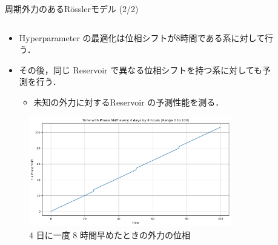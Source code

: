 \begin{frame}{周期外力のあるRösslerモデル (2/2)}
    \begin{columns}[T] %
  
        \begin{column}{.5\textwidth}
            \begin{itemize}
                \item Hyperparameter の最適化は位相シフトが$8$時間である系に対して行う．
                \item その後，同じ Reservoir で異なる位相シフトを持つ系に対しても予測を行う．\begin{itemize}
                    \item 未知の外力に対するReservoir の予測性能を測る．
                \end{itemize}
            \end{itemize}
            \begin{figure}
                \includegraphics[width=0.9\textwidth]{Fig/phase_shift_plot.png}
                \caption{\scriptsize{$4$ 日に一度 $8$ 時間早めたときの外力の位相}}
            \end{figure}
        \end{column}
        \begin{column}{.5\textwidth}
            \vspace{-1cm}
            \begin{figure}

\end{figure}
\end{column}
\end{columns}
\end{frame}
